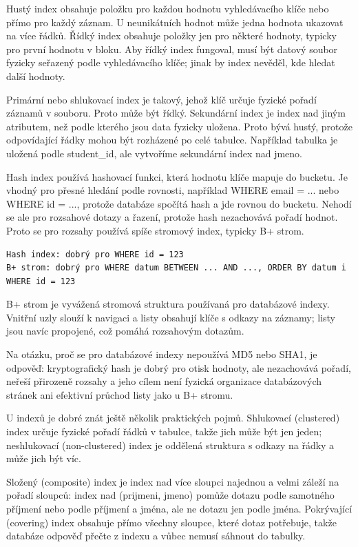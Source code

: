 Hustý index obsahuje položku pro každou hodnotu vyhledávacího klíče nebo přímo pro každý záznam. U neunikátních hodnot může jedna hodnota ukazovat na více řádků. Řídký index obsahuje položky jen pro některé hodnoty, typicky pro první hodnotu v bloku. Aby řídký index fungoval, musí být datový soubor fyzicky seřazený podle vyhledávacího klíče; jinak by index nevěděl, kde hledat další hodnoty.

Primární nebo shlukovací index je takový, jehož klíč určuje fyzické pořadí záznamů v souboru. Proto může být řídký. Sekundární index je index nad jiným atributem, než podle kterého jsou data fyzicky uložena. Proto bývá hustý, protože odpovídající řádky mohou být rozházené po celé tabulce. Například tabulka je uložená podle student\_id, ale vytvoříme sekundární index nad jmeno.

Hash index používá hashovací funkci, která hodnotu klíče mapuje do bucketu. Je vhodný pro přesné hledání podle rovnosti, například WHERE email = ... nebo WHERE id = ..., protože databáze spočítá hash a jde rovnou do bucketu. Nehodí se ale pro rozsahové dotazy a řazení, protože hash nezachovává pořadí hodnot. Proto se pro rozsahy používá spíše stromový index, typicky B+ strom.

\begin{codebox}
\small
\begin{verbatim}
Hash index: dobrý pro WHERE id = 123
B+ strom: dobrý pro WHERE datum BETWEEN ... AND ..., ORDER BY datum i WHERE id = 123
\end{verbatim}
\end{codebox}

B+ strom je vyvážená stromová struktura používaná pro databázové indexy. Vnitřní uzly slouží k navigaci a listy obsahují klíče s odkazy na záznamy; listy jsou navíc propojené, což pomáhá rozsahovým dotazům.

Na otázku, proč se pro databázové indexy nepoužívá MD5 nebo SHA1, je odpověď: kryptografický hash je dobrý pro otisk hodnoty, ale nezachovává pořadí, neřeší přirozeně rozsahy a jeho cílem není fyzická organizace databázových stránek ani efektivní průchod listy jako u B+ stromu.

U indexů je dobré znát ještě několik praktických pojmů. Shlukovací (clustered) index určuje fyzické pořadí řádků v tabulce, takže jich může být jen jeden; neshlukovací (non-clustered) index je oddělená struktura s odkazy na řádky a může jich být víc.

Složený (composite) index je index nad více sloupci najednou a velmi záleží na pořadí sloupců: index nad (prijmeni, jmeno) pomůže dotazu podle samotného příjmení nebo podle příjmení a jména, ale ne dotazu jen podle jména. Pokrývající (covering) index obsahuje přímo všechny sloupce, které dotaz potřebuje, takže databáze odpověď přečte z indexu a vůbec nemusí sáhnout do tabulky.

